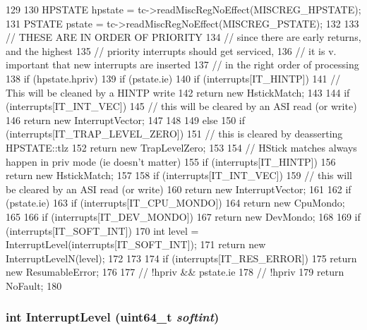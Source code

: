 \begin{DoxyCode}
129     {
130         HPSTATE hpstate = tc->readMiscRegNoEffect(MISCREG_HPSTATE);
131         PSTATE pstate = tc->readMiscRegNoEffect(MISCREG_PSTATE);
132 
133         // THESE ARE IN ORDER OF PRIORITY
134         // since there are early returns, and the highest
135         // priority interrupts should get serviced,
136         // it is v. important that new interrupts are inserted
137         // in the right order of processing
138         if (hpstate.hpriv) {
139             if (pstate.ie) {
140                 if (interrupts[IT_HINTP]) {
141                     // This will be cleaned by a HINTP write
142                     return new HstickMatch;
143                 }
144                 if (interrupts[IT_INT_VEC]) {
145                     // this will be cleared by an ASI read (or write)
146                     return new InterruptVector;
147                 }
148             }
149         } else {
150             if (interrupts[IT_TRAP_LEVEL_ZERO]) {
151                     // this is cleared by deasserting HPSTATE::tlz
152                     return new TrapLevelZero;
153             }
154             // HStick matches always happen in priv mode (ie doesn't matter)
155             if (interrupts[IT_HINTP]) {
156                 return new HstickMatch;
157             }
158             if (interrupts[IT_INT_VEC]) {
159                 // this will be cleared by an ASI read (or write)
160                 return new InterruptVector;
161             }
162             if (pstate.ie) {
163                 if (interrupts[IT_CPU_MONDO]) {
164                     return new CpuMondo;
165                 }
166                 if (interrupts[IT_DEV_MONDO]) {
167                     return new DevMondo;
168                 }
169                 if (interrupts[IT_SOFT_INT]) {
170                     int level = InterruptLevel(interrupts[IT_SOFT_INT]);
171                     return new InterruptLevelN(level);
172                 }
173 
174                 if (interrupts[IT_RES_ERROR]) {
175                     return new ResumableError;
176                 }
177             } // !hpriv && pstate.ie
178         }  // !hpriv
179         return NoFault;
180     }
\end{DoxyCode}
\hypertarget{classSparcISA_1_1Interrupts_af15feb308e3a6ec0180955608ab53125}{
\subsubsection[{InterruptLevel}]{\setlength{\rightskip}{0pt plus 5cm}int InterruptLevel (uint64\_\-t {\em softint})}}
\label{classSparcISA_1_1Interrupts_af15feb308e3a6ec0180955608ab53125}



